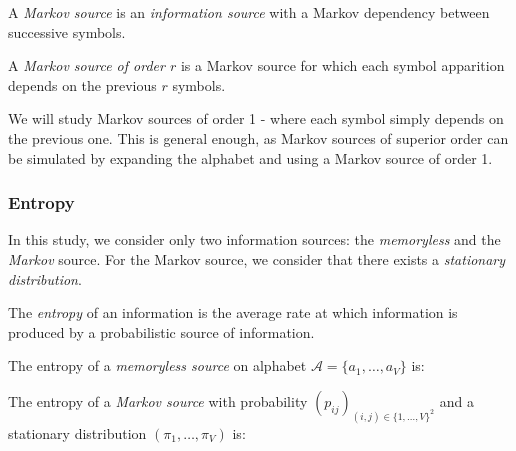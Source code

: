 \begin{df}
    \label{def:markov}
    A \emph{Markov source} is an \emph{information source}
    with a Markov dependency between successive symbols.
\end{df}

\begin{df}
    \label{def:markovorder}
    A \emph{Markov source of order $r$} is a Markov source
    for which each symbol apparition depends on the previous 
    $r$ symbols.
\end{df}

\begin{rmk}
    \label{rmk:markov2}
    We will study Markov sources of order 1 - where each
    symbol simply depends on the previous one. This is 
    general enough, as Markov sources of superior order
    can be simulated by expanding the alphabet and 
    using a Markov source of order 1.
\end{rmk}

\subsubsection{ Entropy }

    In this study, we consider only two information sources:
    the \emph{memoryless} and the \emph{Markov} source.
    For the Markov source, we consider that there exists a 
    \emph{stationary distribution}.

    \begin{df}
        \label{def:entropy}
        The \emph{entropy} of an information is the average
        rate at which information is produced by a probabilistic
        source of information.
    \end{df}

    \begin{prop}
        \label{prop:memorylessentropy}
        The entropy of a \emph{memoryless source} on 
        alphabet $\mathcal{A} = \{ a_1,\dots,a_V \}$ is:
    \end{prop}

    \begin{prop}
        \label{prop:markoventropy}
        The entropy of a \emph{Markov source} with probability
        $(p_{i j})_{(i, j) \in { \{1,\dots,V\} }^2} $ and a 
        stationary distribution $(\pi_1, \dots, \pi_V)$ is:
    \end{prop}


